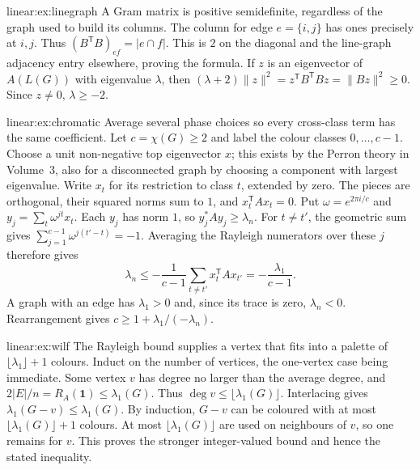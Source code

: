\begin{solution}{linear:ex:linegraph}
\idea A Gram matrix is positive semidefinite, regardless of the graph used to build its columns.
\writeup The column for edge $e=\{i,j\}$ has ones precisely at $i,j$. Thus $(B^{\mathsf T}B)_{ef}=|e\cap f|$. This is $2$ on the diagonal and the line-graph adjacency entry elsewhere, proving the formula. If $z$ is an eigenvector of $A(L(G))$ with eigenvalue $\lambda$, then
$(\lambda+2)\|z\|^2=z^{\mathsf T}B^{\mathsf T}Bz=\|Bz\|^2\ge0$.
Since $z\ne0$, $\lambda\ge-2$.
\end{solution}

\begin{solution}{linear:ex:chromatic}
\idea Average several phase choices so every cross-class term has the same coefficient.
\writeup Let $c=\chi(G)\ge2$ and label the colour classes $0,\ldots,c-1$. Choose a unit non-negative top eigenvector $x$; this exists by the Perron theory in Volume~3, also for a disconnected graph by choosing a component with largest eigenvalue. Write $x_t$ for its restriction to class $t$, extended by zero. The pieces are orthogonal, their squared norms sum to $1$, and $x_t^{\mathsf T}Ax_t=0$.
Put $\omega=e^{2\pi i/c}$ and $y_j=\sum_t\omega^{jt}x_t$. Each $y_j$ has norm $1$, so $y_j^*Ay_j\ge\lambda_n$. For $t\ne t'$, the geometric sum gives $\sum_{j=1}^{c-1}\omega^{j(t'-t)}=-1$. Averaging the Rayleigh numerators over these $j$ therefore gives
\[
\lambda_n\le-\frac1{c-1}\sum_{t\ne t'}x_t^{\mathsf T}Ax_{t'}
=-\frac{\lambda_1}{c-1}.
\]
A graph with an edge has $\lambda_1>0$ and, since its trace is zero, $\lambda_n<0$. Rearrangement gives $c\ge1+\lambda_1/(-\lambda_n)$.
\end{solution}

\begin{solution}{linear:ex:wilf}
\idea The Rayleigh bound supplies a vertex that fits into a palette of $\lfloor\lambda_1\rfloor+1$ colours.
\writeup Induct on the number of vertices, the one-vertex case being immediate. Some vertex $v$ has degree no larger than the average degree, and
$2|E|/n=R_A(\mathbf1)\le\lambda_1(G)$.
Thus $\deg v\le\lfloor\lambda_1(G)\rfloor$. Interlacing gives $\lambda_1(G-v)\le\lambda_1(G)$. By induction, $G-v$ can be coloured with at most $\lfloor\lambda_1(G)\rfloor+1$ colours. At most $\lfloor\lambda_1(G)\rfloor$ are used on neighbours of $v$, so one remains for $v$. This proves the stronger integer-valued bound and hence the stated inequality.
\end{solution}

